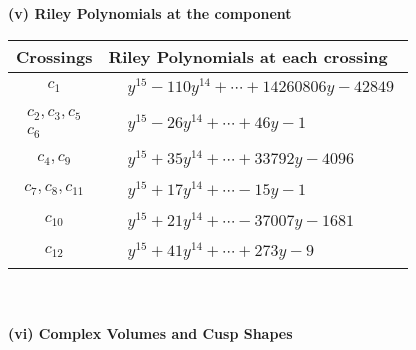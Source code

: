 \documentclass[1p]{elsarticle_modified}
\theoremstyle{definition}
\begin{document}
\newpage\renewcommand{\arraystretch}{1}
\flushleft \textbf{(v) Riley Polynomials at the component}\newline \\
\begin{tabular}{m{50pt}|m{274pt}}
Crossings & \hspace{64pt}Riley Polynomials at each crossing \\
\hline $$\begin{aligned}c_{1}\end{aligned}$$&$\begin{aligned}
&y^{15}-110 y^{14}+\cdots+14260806 y-42849
\end{aligned}$\\
\hline $$\begin{aligned}c_{2},c_{3},c_{5}\\c_{6}\end{aligned}$$&$\begin{aligned}
&y^{15}-26 y^{14}+\cdots+46 y-1
\end{aligned}$\\
\hline $$\begin{aligned}c_{4},c_{9}\end{aligned}$$&$\begin{aligned}
&y^{15}+35 y^{14}+\cdots+33792 y-4096
\end{aligned}$\\
\hline $$\begin{aligned}c_{7},c_{8},c_{11}\end{aligned}$$&$\begin{aligned}
&y^{15}+17 y^{14}+\cdots-15 y-1
\end{aligned}$\\
\hline $$\begin{aligned}c_{10}\end{aligned}$$&$\begin{aligned}
&y^{15}+21 y^{14}+\cdots-37007 y-1681
\end{aligned}$\\
\hline $$\begin{aligned}c_{12}\end{aligned}$$&$\begin{aligned}
&y^{15}+41 y^{14}+\cdots+273 y-9
\end{aligned}$\\
\hline
\end{tabular}\\~\\
\newpage\flushleft \textbf{(vi) Complex Volumes and Cusp Shapes}
\end{document}
